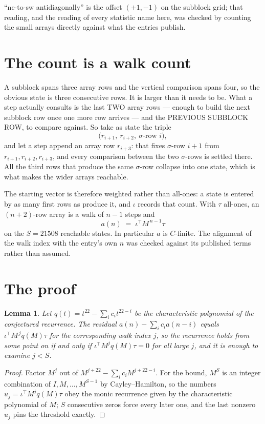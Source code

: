 \documentclass[11pt,a4paper]{article}
\theoremstyle{plain}
\newtheorem{lemma}[theorem]{Lemma}
\theoremstyle{definition}
\begin{document}
``ne-to-sw antidiagonally'' is the offset $(+1,-1)$ on the subblock grid; that reading, and
the reading of every statistic name here, was checked by counting the small arrays directly
against what the entries publish.

\section{The count is a walk count}

A subblock spans three array rows and the vertical comparison spans four, so the obvious state
is three consecutive rows. It is larger than it needs to be. What a step actually consults is
the last TWO array rows --- enough to build the next subblock row once one more row arrives ---
and the PREVIOUS SUBBLOCK ROW, to compare against. So take as state the triple
\[
\bigl(r_{i+1},\ r_{i+2},\ \sigma\text{-row }i\bigr),
\]
and let a step append an array row $r_{i+3}$: that fixes $\sigma$-row $i+1$ from
$r_{i+1},r_{i+2},r_{i+3}$, and every comparison between the two $\sigma$-rows is settled
there. All the third rows that produce the same $\sigma$-row collapse into one state, which is
what makes the wider arrays reachable.

The starting vector is therefore weighted rather than all-ones: a state is entered by as many
first rows as produce it, and $\iota$ records that count. With $\tau$ all-ones, an
$(n+2)$-row array is a walk of $n-1$ steps and
\[
a(n)\;=\;\iota^{\!\top}M^{\,n-1}\tau
\]
on the $S=21508$ reachable states. In particular $a$ is $C$-finite. The alignment of the walk
index with the entry's own $n$ was checked against its published terms rather than assumed.

\section{The proof}

\begin{lemma}\label{lem:crit}
Let $q(t)=t^{22}-\sum_i c_it^{22-i}$ be the characteristic polynomial of the
conjectured recurrence. The residual $a(n)-\sum_ic_ia(n-i)$ equals
$\iota^{\!\top}M^{\,j}q(M)\tau$ for the corresponding walk index $j$, so the recurrence
holds from some point on if and only if $\iota^{\!\top}M^{j}q(M)\tau=0$ for all large $j$,
and it is enough to examine $j<S$.
\end{lemma}

\begin{proof}
Factor $M^{j}$ out of $M^{j+22}-\sum_ic_iM^{j+22-i}$. For the bound, $M^{S}$
is an integer combination of $I,M,\dots,M^{S-1}$ by Cayley--Hamilton, so the numbers
$u_j=\iota^{\!\top}M^{j}q(M)\tau$ obey the monic recurrence given by the characteristic
polynomial of $M$; $S$ consecutive zeros force every later one, and the last nonzero $u_j$
pins the threshold exactly.
\end{proof}
\end{document}
